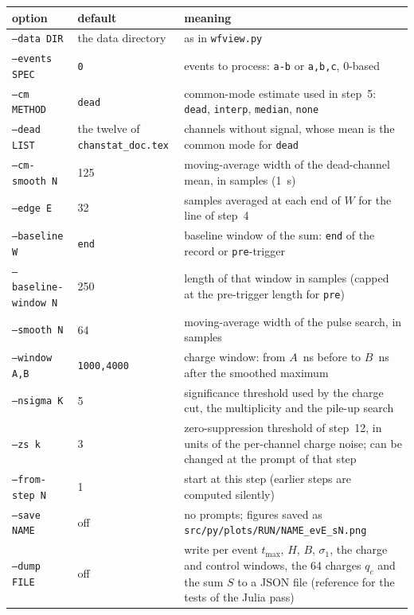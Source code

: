 \documentclass[11pt]{article}
\newcommand{\code}[1]{\texttt{#1}}
\newcommand{\us}{\textmu s}
\begin{document}
\begin{center}
\begin{tabular}{l l p{76mm}}
\toprule
option & default & meaning \\
\midrule
\code{--data DIR} & the data directory & as in \code{wfview.py} \\
\code{--events SPEC} & \code{0} & events to process: \code{a-b} or \code{a,b,c}, 0-based \\
\code{--cm METHOD} & \code{dead} & common-mode estimate used in step~5: \code{dead}, \code{interp}, \code{median}, \code{none} \\
\code{--dead LIST} & the twelve of \code{chanstat\_doc.tex} & channels without signal, whose mean is the common mode for \code{dead} \\
\code{--cm-smooth N} & 125 & moving-average width of the dead-channel mean, in samples (1~\us) \\
\code{--edge E} & 32 & samples averaged at each end of $W$ for the line of step~4 \\
\code{--baseline W} & \code{end} & baseline window of the sum: \code{end} of the record or \code{pre}-trigger \\
\code{--baseline-window N} & 250 & length of that window in samples (capped at the pre-trigger length for \code{pre}) \\
\code{--smooth N} & 64 & moving-average width of the pulse search, in samples \\
\code{--window A,B} & \code{1000,4000} & charge window: from $A$~ns before to $B$~ns after the smoothed maximum \\
\code{--nsigma K} & 5 & significance threshold used by the charge cut, the multiplicity and the pile-up search \\
\code{--zs k} & 3 & zero-suppression threshold of step~12, in units of the per-channel charge noise; can be changed at the prompt of that step \\
\code{--from-step N} & 1 & start at this step (earlier steps are computed silently) \\
\code{--save NAME} & off & no prompts; figures saved as \code{src/py/plots/RUN/NAME\_evE\_sN.png} \\
\code{--dump FILE} & off & write per event $t_{\max}$, $H$, $B$, $\sigma_1$, the charge and control windows, the 64 charges $q_c$ and the sum $S$ to a JSON file (reference for the tests of the Julia pass) \\
\bottomrule
\end{tabular}
\end{center}
\end{document}
